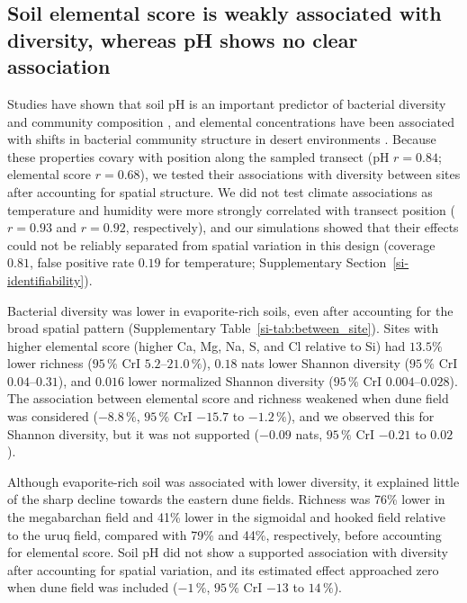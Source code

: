\documentclass[fleqn,10pt,numbers]{olplainarticle}
\begin{document}
\subsection*{Soil elemental score is weakly associated with diversity, whereas pH shows no clear association}
Studies have shown that soil pH is an important predictor of bacterial diversity and community composition \cite{lauber2009pyrosequencing,fierer2006diversity}, and elemental concentrations have been associated with shifts in bacterial community structure in desert environments \cite{debbagh2025plant}. Because these properties covary with position along the sampled transect (pH $r = 0.84$; elemental score $r=0.68$), we tested their associations with diversity between sites after accounting for spatial structure. We did not test climate associations as temperature and humidity were more strongly correlated with transect position ($r = 0.93$ and $r = 0.92$, respectively), and our simulations showed that their effects could not be reliably separated from spatial variation in this design (coverage $0.81$, false positive rate $0.19$ for temperature; Supplementary Section~\ref{si-identifiability}).

Bacterial diversity was lower in evaporite-rich soils, even after accounting for the broad spatial pattern (Supplementary Table~\ref{si-tab:between_site}). Sites with higher elemental score (higher Ca, Mg, Na, S, and Cl relative to Si) had $13.5\%$ lower richness ($95\,\%$ CrI $5.2$--$21.0\,\%$), $0.18$ nats lower Shannon diversity ($95\,\%$ CrI $0.04$--$0.31$), and $0.016$ lower normalized Shannon diversity ($95\,\%$ CrI $0.004$--$0.028$). The association between elemental score and richness weakened when dune field was considered ($-8.8\,\%$, $95\,\%$ CrI $-15.7$ to $-1.2\,\%$), and we observed this for Shannon diversity, but it was not supported ($-0.09$ nats, $95\,\%$ CrI $-0.21$ to $0.02$).

Although evaporite-rich soil was associated with lower diversity, it explained little of the sharp decline towards the eastern dune fields. Richness was 76\% lower in the megabarchan field and 41\% lower in the sigmoidal and hooked field relative to the uruq field, compared with 79\% and 44\%, respectively, before accounting for elemental score. Soil pH did not show a supported association with diversity after accounting for spatial variation, and its estimated effect approached zero when dune field was included  ($-1\,\%$, $95\,\%$ CrI $-13$ to $14\,\%$).
\end{document}
